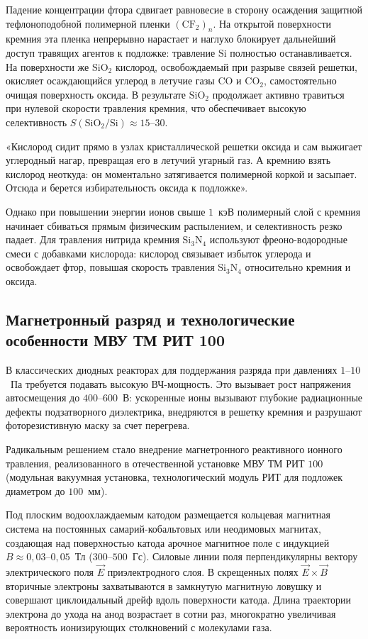 \documentclass[12pt,a4paper]{article}
\theoremstyle{plain}
\theoremstyle{definition}
\theoremstyle{remark}
\numberwithin{equation}{section}
\begin{document}
Падение концентрации фтора сдвигает равновесие в сторону осаждения защитной тефлоноподобной полимерной пленки $(\mathrm{CF}_2)_n$. На открытой поверхности кремния эта пленка непрерывно нарастает и наглухо блокирует дальнейший доступ травящих агентов к подложке: травление $\mathrm{Si}$ полностью останавливается. На поверхности же $\mathrm{SiO}_2$ кислород, освобождаемый при разрыве связей решетки, окисляет осаждающийся углерод в летучие газы $\mathrm{CO}$ и $\mathrm{CO}_2$, самостоятельно очищая поверхность оксида. В результате $\mathrm{SiO}_2$ продолжает активно травиться при нулевой скорости травления кремния, что обеспечивает высокую селективность $S(\mathrm{SiO}_2/\mathrm{Si}) \approx 15\text{--}30$.

«Кислород сидит прямо в узлах кристаллической решетки оксида и сам выжигает углеродный нагар, превращая его в летучий угарный газ. А кремнию взять кислород неоткуда: он моментально затягивается полимерной коркой и засыпает. Отсюда и берется избирательность оксида к подложке».

Однако при повышении энергии ионов свыше $1$~кэВ полимерный слой с кремния начинает сбиваться прямым физическим распылением, и селективность резко падает. Для травления нитрида кремния $\mathrm{Si}_3\mathrm{N}_4$ используют фреоно-водородные смеси с добавками кислорода: кислород связывает избыток углерода и освобождает фтор, повышая скорость травления $\mathrm{Si}_3\mathrm{N}_4$ относительно кремния и оксида.

\subsection{Магнетронный разряд и технологические особенности МВУ ТМ РИТ 100}

В классических диодных реакторах для поддержания разряда при давлениях $1\text{--}10$~Па требуется подавать высокую ВЧ-мощность. Это вызывает рост напряжения автосмещения до $400\text{--}600$~В: ускоренные ионы вызывают глубокие радиационные дефекты подзатворного диэлектрика, внедряются в решетку кремния и разрушают фоторезистивную маску за счет перегрева.

Радикальным решением стало внедрение магнетронного реактивного ионного травления, реализованного в отечественной установке МВУ ТМ РИТ $100$ (модульная вакуумная установка, технологический модуль РИТ для подложек диаметром до $100$~мм). 

Под плоским водоохлаждаемым катодом размещается кольцевая магнитная система на постоянных самарий-кобальтовых или неодимовых магнитах, создающая над поверхностью катода арочное магнитное поле с индукцией $B \approx 0{,}03\text{--}0{,}05$~Тл ($300\text{--}500$~Гс). Силовые линии поля перпендикулярны вектору электрического поля $\vec{E}$ приэлектродного слоя. В скрещенных полях $\vec{E} \times \vec{B}$ вторичные электроны захватываются в замкнутую магнитную ловушку и совершают циклоидальный дрейф вдоль поверхности катода. Длина траектории электрона до ухода на анод возрастает в сотни раз, многократно увеличивая вероятность ионизирующих столкновений с молекулами газа.
\end{document}
